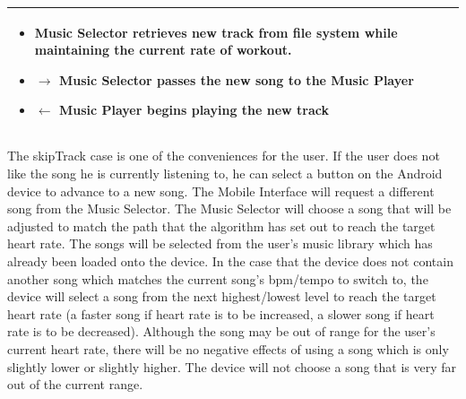 \documentclass[letterpaper,english, 12pt]{scrreprt}
\begin{document}
\begin{center}
\begin{tabular}{|C{15cm}|}
\begin{itemize}
                                        \item Music Selector retrieves new track from file system while maintaining the current rate of workout.
					\item $\rightarrow$ Music Selector passes the new song to the Music Player
                                        \item $\leftarrow$ Music Player begins playing the new track
                                \end{itemize}

				\\
                \hline
        \end{tabular}
\end{center}

The skipTrack case is one of the conveniences for the user. If the user does not like the song he is currently listening to, he can select a button on the Android device to advance to a new song. The Mobile Interface will request a different song from the Music Selector. The Music Selector will choose a song that will be adjusted to match the path that the algorithm has set out to reach the target heart rate. The songs will be selected from the user's music library which has already been loaded onto the device. In the case that the device does not contain another song which matches the current song's bpm/tempo to switch to, the device will select a song from the next highest/lowest level to reach the target heart rate (a faster song if heart rate is to be increased, a slower song if heart rate is to be decreased). Although the song may be out of range for the user's current heart rate, there will be no negative effects of using a song which is only slightly lower or slightly higher. The device will not choose a song that is very far out of the current range. 
\end{document}
